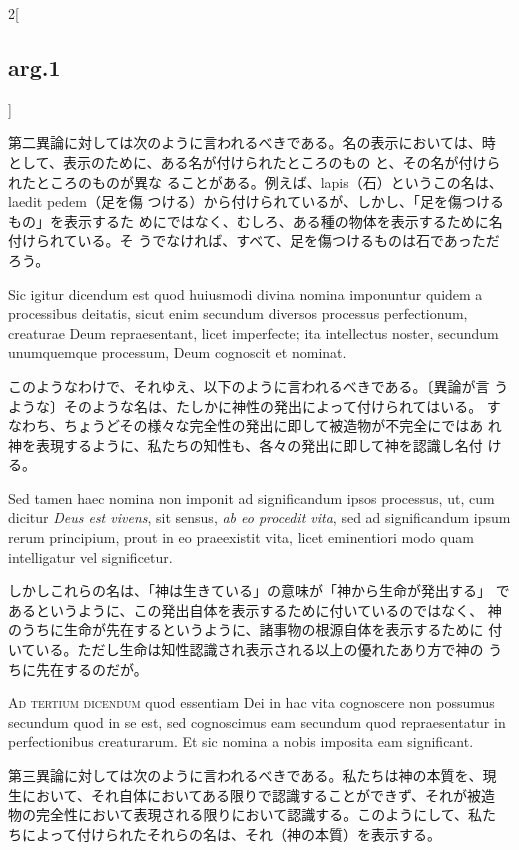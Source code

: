 \documentclass[paper=a4paper,fontsize=10pt,jafontsize=9pt,titlepage]{jlreq}
\begin{document}
\begin{paracol}{2}[\subsection{arg.1}]
\switchcolumn

第二異論に対しては次のように言われるべきである。名の表示においては、時
として、表示のために、ある名が付けられたところのもの
と、その名が付けられたところのものが異な
ることがある。例えば、lapis（石）というこの名は、laedit pedem（足を傷
つける）から付けられているが、しかし、「足を傷つけるもの」を表示するた
めにではなく、むしろ、ある種の物体を表示するために名付けられている。そ
うでなければ、すべて、足を傷つけるものは石であっただろう。

\switchcolumn*

Sic igitur dicendum est quod huiusmodi divina nomina imponuntur quidem
a processibus deitatis, sicut enim secundum diversos processus
perfectionum, creaturae Deum repraesentant, licet imperfecte; ita
intellectus noster, secundum unumquemque processum, Deum cognoscit et
nominat.

\switchcolumn

このようなわけで、それゆえ、以下のように言われるべきである。〔異論が言
うような〕そのような名は、たしかに神性の発出によって付けられてはいる。
すなわち、ちょうどその様々な完全性の発出に即して被造物が不完全にではあ
れ神を表現するように、私たちの知性も、各々の発出に即して神を認識し名付
ける。

\switchcolumn*

Sed tamen haec nomina non imponit ad significandum ipsos processus,
ut, cum dicitur {\itshape Deus est vivens}, sit sensus, {\itshape ab eo procedit
vita}, sed ad significandum ipsum rerum principium, prout in eo
praeexistit vita, licet eminentiori modo quam intelligatur vel
significetur.

\switchcolumn

しかしこれらの名は、「神は生きている」の意味が「神から生命が発出する」
であるというように、この発出自体を表示するために付いているのではなく、
神のうちに生命が先在するというように、諸事物の根源自体を表示するために
付いている。ただし生命は知性認識され表示される以上の優れたあり方で神の
うちに先在するのだが。

\switchcolumn*[\subsection{ad.3}]

{\scshape Ad tertium dicendum} quod essentiam Dei in hac vita cognoscere
non possumus secundum quod in se est, sed cognoscimus eam secundum
quod repraesentatur in perfectionibus creaturarum. Et sic nomina a
nobis imposita eam significant.

\switchcolumn

第三異論に対しては次のように言われるべきである。私たちは神の本質を、現
生において、それ自体においてある限りで認識することができず、それが被造
物の完全性において表現される限りにおいて認識する。このようにして、私た
ちによって付けられたそれらの名は、それ（神の本質）を表示する。

\end{paracol}
\end{document}
